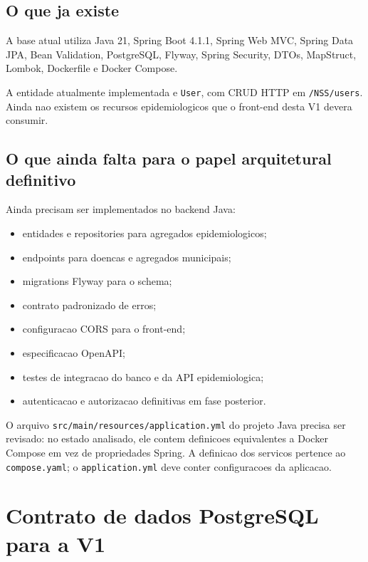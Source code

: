 \documentclass[12pt,a4paper]{article}
\begin{document}
\subsection{O que ja existe}

A base atual utiliza Java 21, Spring Boot 4.1.1, Spring Web MVC, Spring Data JPA, Bean Validation, PostgreSQL, Flyway, Spring Security, DTOs, MapStruct, Lombok, Dockerfile e Docker Compose.

A entidade atualmente implementada e \texttt{User}, com CRUD HTTP em \texttt{/NSS/users}. Ainda nao existem os recursos epidemiologicos que o front-end desta V1 devera consumir.

\subsection{O que ainda falta para o papel arquitetural definitivo}

Ainda precisam ser implementados no backend Java:

\begin{itemize}[leftmargin=*]
    \item entidades e repositories para agregados epidemiologicos;
    \item endpoints para doencas e agregados municipais;
    \item migrations Flyway para o schema;
    \item contrato padronizado de erros;
    \item configuracao CORS para o front-end;
    \item especificacao OpenAPI;
    \item testes de integracao do banco e da API epidemiologica;
    \item autenticacao e autorizacao definitivas em fase posterior.
\end{itemize}

\begin{warningbox}
O arquivo \texttt{src/main/resources/application.yml} do projeto Java precisa ser revisado: no estado analisado, ele contem definicoes equivalentes a Docker Compose em vez de propriedades Spring. A definicao dos servicos pertence ao \texttt{compose.yaml}; o \texttt{application.yml} deve conter configuracoes da aplicacao.
\end{warningbox}

\section{Contrato de dados PostgreSQL para a V1}
\end{document}
